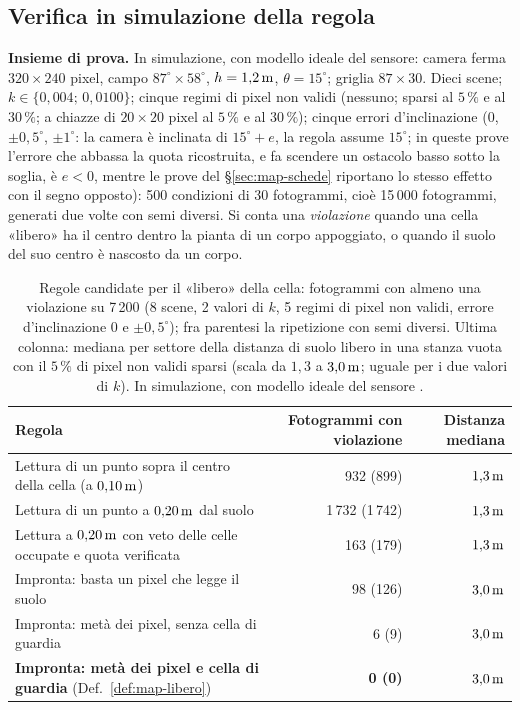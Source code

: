 \subsection{Verifica in simulazione della regola}\label{sec:map-banco}

\textbf{Insieme di prova.} In simulazione, con modello ideale del sensore: camera ferma $320\times240$ pixel, campo $87^\circ\times58^\circ$, $h=1{,}2\,\mathrm{m}$, $\theta=15^\circ$; griglia $87\times30$. Dieci scene; $k\in\{0{,}004;\,0{,}0100\}$; cinque regimi di pixel non validi (nessuno; sparsi al $5\,\%$ e al $30\,\%$; a chiazze di $20\times20$ pixel al $5\,\%$ e al $30\,\%$); cinque errori d'inclinazione ($0$, $\pm0{,}5^\circ$, $\pm1^\circ$: la camera è inclinata di $15^\circ+e$, la regola assume $15^\circ$; in queste prove l'errore che abbassa la quota ricostruita, e fa scendere un ostacolo basso sotto la soglia, è $e<0$, mentre le prove del \S\ref{sec:map-schede} riportano lo stesso effetto con il segno opposto): 500 condizioni di 30 fotogrammi, cioè 15\,000 fotogrammi, generati due volte con semi diversi. Si conta una \emph{violazione} quando una cella «libero» ha il centro dentro la pianta di un corpo appoggiato, o quando il suolo del suo centro è nascosto da un corpo.

\begin{table}[t]\centering\small
\caption{Regole candidate per il «libero» della cella: fotogrammi con almeno una violazione su 7\,200 (8 scene, 2 valori di $k$, 5 regimi di pixel non validi, errore d'inclinazione $0$ e $\pm0{,}5^\circ$); fra parentesi la ripetizione con semi diversi. Ultima colonna: mediana per settore della distanza di suolo libero in una stanza vuota con il $5\,\%$ di pixel non validi sparsi (scala da $1{,}3$ a $3{,}0\unita{m}$; uguale per i due valori di $k$). In simulazione, con modello ideale del sensore .}\label{tab:map-regole}
\begin{tabularx}{\linewidth}{Lrr}
\toprule
Regola & Fotogrammi con violazione & Distanza mediana \\
\midrule
Lettura di un punto sopra il centro della cella (a $0{,}10\,\mathrm{m}$) & 932 (899) & $1{,}3\,\mathrm{m}$\\
Lettura di un punto a $0{,}20\,\mathrm{m}$ dal suolo & 1\,732 (1\,742) & $1{,}3\,\mathrm{m}$\\
Lettura a $0{,}20\,\mathrm{m}$ con veto delle celle occupate e quota verificata & 163 (179) & $1{,}3\,\mathrm{m}$\\
Impronta: basta un pixel che legge il suolo & 98 (126) & $3{,}0\unita{m}$\\
Impronta: metà dei pixel, senza cella di guardia & 6 (9) & $3{,}0\unita{m}$\\
\textbf{Impronta: metà dei pixel e cella di guardia} (Def.~\ref{def:map-libero}) & \textbf{0 (0)} & $3{,}0\unita{m}$\\
\bottomrule
\end{tabularx}
\end{table}

